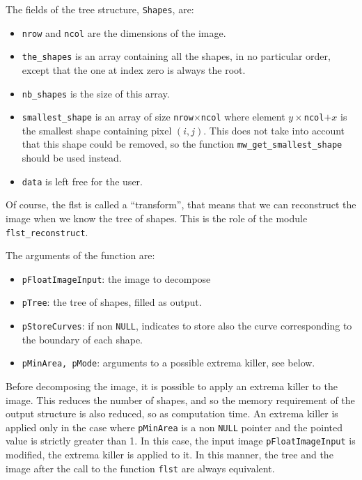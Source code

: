 The fields of the tree structure, \texttt{Shapes}, are:
\begin{itemize}
\item \texttt{nrow} and \texttt{ncol} are the dimensions of the image.
\item \texttt{the\_shapes} is an array containing all the shapes, in no
particular order, except that the one at index zero is always the root.
\item \texttt{nb\_shapes} is the size of this array.
\item \texttt{smallest\_shape} is an array of size
\texttt{nrow}$\times$\texttt{ncol} where element $y\times$\texttt{ncol}$+x$
is the smallest shape containing pixel $(i,j)$. This does not take into
account that this shape could be removed, so the function
\texttt{mw\_get\_smallest\_shape} should be used instead.
\item \texttt{data} is left free for the user.
\end{itemize}

Of course, the flst is called a ``transform'', that means that we can
reconstruct the image when we know the tree of shapes. This is the role of the
module \texttt{flst\_reconstruct}.

The arguments of the function are:
\begin{itemize}
\item \texttt{pFloatImageInput}: the image to decompose
\item \texttt{pTree}: the tree of shapes, filled as output.
\item \texttt{pStoreCurves}: if non \texttt{NULL}, indicates to store also the
curve corresponding to the boundary of each shape.
\item \texttt{pMinArea, pMode}: arguments to a possible extrema killer, see below.
\end{itemize}

Before decomposing the image, it is possible to apply an extrema killer to the
image. This reduces the number of shapes, and so the memory requirement of the
output structure is also reduced, so as computation time. An extrema killer is
applied only in the case where \texttt{pMinArea} is a non \texttt{NULL}
pointer and the pointed value is strictly greater than 1. In this case, the
input image \texttt{pFloatImageInput} is modified, the extrema killer is
applied to it. In this manner, the tree and the image after the call to the
function \texttt{flst} are always equivalent.

